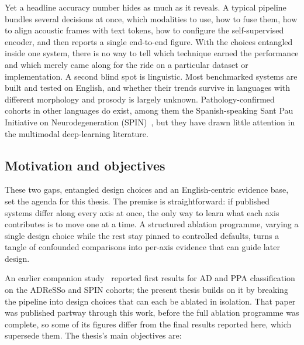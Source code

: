 Yet a headline accuracy number hides as much as it reveals. A typical pipeline bundles several decisions at once, which modalities to use, how to fuse them, how to align acoustic frames with text tokens, how to configure the self-supervised encoder, and then reports a single end-to-end figure. With the choices entangled inside one system, there is no way to tell which technique earned the performance and which merely came along for the ride on a particular dataset or implementation. A second blind spot is linguistic. Most benchmarked systems are built and tested on English, and whether their trends survive in languages with different morphology and prosody is largely unknown. Pathology-confirmed cohorts in other languages do exist, among them the Spanish-speaking Sant Pau Initiative on Neurodegeneration (SPIN)~\cite{alcolea2019spin}, but they have drawn little attention in the multimodal deep-learning literature.

\subsection{Motivation and objectives}
\label{ssec:objectives}

These two gaps, entangled design choices and an English-centric evidence base, set the agenda for this thesis. The premise is straightforward: if published systems differ along every axis at once, the only way to learn what each axis contributes is to move one at a time. A structured ablation programme, varying a single design choice while the rest stay pinned to controlled defaults, turns a tangle of confounded comparisons into per-axis evidence that can guide later design.

An earlier companion study~\cite{esteve2025speechadppa} reported first results for AD and PPA classification on the ADReSSo and SPIN cohorts; the present thesis builds on it by breaking the pipeline into design choices that can each be ablated in isolation. That paper was published partway through this work, before the full ablation programme was complete, so some of its figures differ from the final results reported here, which supersede them. The thesis's main objectives are:

